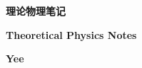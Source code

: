 \frontmatter

\begin{titlepage}
\begin{flushleft}
    \centering
\textbf{\fontsize{60}{60}\songti\bfseries{理论物理笔记}\\}
\begin{flushleft}
    \centering
    \textbf{\Huge Theoretical Physics Notes}
\end{flushleft}


\begin{flushright}
\textbf{\huge Yee}
\end{flushright}

\vspace{\fill}
\centering
\textbf{\huge {}}
\end{flushleft}
\end{titlepage}
\restoregeometry


\thispagestyle{empty}


